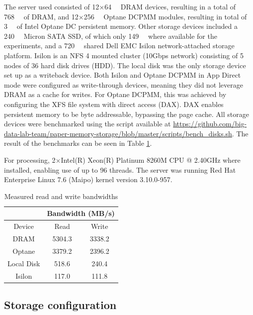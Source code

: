 The server used consisted of 12$\times$\SI{64}{\gibi\byte} DRAM devices,
resulting in a total of \SI{768}{\gibi\byte} of DRAM, and
12$\times$\SI{256}{\gibi\byte} Optane DCPMM modules, resulting in total of
\SI{3}{\tebi\byte} of Intel Optane DC persistent memory. Other storage devices
included a \SI{240}{\gibi\byte} Micron SATA SSD, of which only
\SI{149}{\gibi\byte} where available for the experiments, and a
\SI{720}{\tebi\byte} shared Dell EMC Isilon network-attached storage platform.
Isilon is an NFS 4 mounted cluster (10Gbps network) consisting of 5 nodes of 36
hard disk drives (HDD). The local disk was the only storage device set up as a
writeback device. Both Isilon and Optane DCPMM in App Direct mode were
configured as write-through devices, meaning they did not leverage DRAM as a
cache for writes. For Optane DCPMM, this was achieved by configuring the XFS
file system with direct access (DAX). DAX enables persistent memory to be byte
addressable, bypassing the page cache. All storage devices were benchmarked
using the script available at
\url{https://github.com/big-data-lab-team/paper-memory-storage/blob/master/scripts/bench_disks.sh}.
The result of the benchmarks can be seen in Table \ref{table:optane:bandwidths}.

For processing, 2$\times$Intel(R) Xeon(R) Platinum 8260M CPU @ 2.40GHz where
installed, enabling use of up to 96 threads. The server was running Red Hat
Enterprise Linux 7.6 (Maipo) kernel version 3.10.0-957. 


\begin{table}
\begin{center}
 \begin{tabular}{ |c|c|c| } 
     \cline{2-3}
     \multicolumn{1}{c|}{} & \multicolumn{2}{c|}{Bandwidth (MB/s)} \\\hline
  Device & Read & Write \\
 \hline
 DRAM & 5304.3 & 3338.2 \\  
 Optane & 3379.2 & 2396.2 \\   
 Local Disk & 518.6 & 240.4 \\
 Isilon & 117.0 & 111.8 \\
 \hline
\end{tabular}\caption{Measured read and write
bandwidths}\label{table:optane:bandwidths}
\end{center}
\end{table}



\subsection{Storage configuration}

